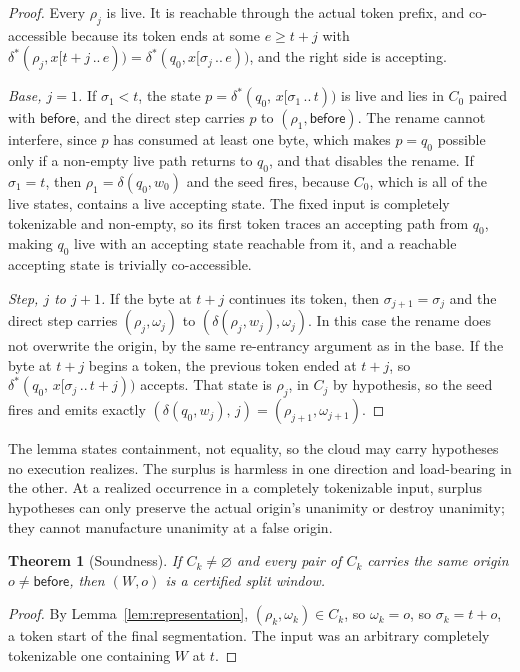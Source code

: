 \documentclass[11pt,a4paper]{article}
\theoremstyle{definition}
\theoremstyle{plain}
\newtheorem{theorem}{Theorem}
\newcommand{\before}{\mathsf{before}}
\begin{document}
\begin{proof}
Every $\rho_j$ is live. It is reachable through the actual token prefix, and co-accessible because its token ends at
some $e \geq t+j$ with $\delta^*(\rho_j, x[t+j \,..\, e)) = \delta^*(q_0, x[\sigma_j \,..\, e))$, and the right side is
accepting.

\emph{Base, $j = 1$.} If $\sigma_1 < t$, the state $p = \delta^*(q_0,\, x[\sigma_1 \,..\, t))$ is live and lies in $C_0$
paired with $\before$, and the direct step carries $p$ to $(\rho_1, \before)$. The rename cannot interfere, since $p$
has consumed at least one byte, which makes $p = q_0$ possible only if a non-empty live path returns to $q_0$, and that
disables the rename. If $\sigma_1 = t$, then $\rho_1 = \delta(q_0, w_0)$ and the seed fires, because $C_0$, which is all
of the live states, contains a live accepting state. The fixed input is completely tokenizable and non-empty, so its
first token traces an accepting path from $q_0$, making $q_0$ live with an accepting state reachable from it, and a
reachable accepting state is trivially co-accessible.

\emph{Step, $j$ to $j+1$.} If the byte at $t+j$ continues its token, then $\sigma_{j+1} = \sigma_j$ and the direct step
carries $(\rho_j, \omega_j)$ to $(\delta(\rho_j, w_j), \omega_j)$. In this case the rename does not overwrite the
origin, by the same re-entrancy argument as in the base. If the byte at $t+j$ begins a token, the previous token ended
at $t+j$, so $\delta^*(q_0,\, x[\sigma_j \,..\, t+j))$ accepts. That state is $\rho_j$, in $C_j$ by hypothesis, so the
seed fires and emits exactly $(\delta(q_0, w_j),\, j) = (\rho_{j+1}, \omega_{j+1})$.
\end{proof}

The lemma states containment, not equality, so the cloud may carry hypotheses no execution realizes. The surplus is
harmless in one direction and load-bearing in the other. At a realized occurrence in a completely tokenizable input,
surplus hypotheses can only preserve the actual origin's unanimity or destroy unanimity; they cannot manufacture
unanimity at a false origin.

\begin{theorem}[Soundness]
\label{thm:soundness}
If $C_k \neq \varnothing$ and every pair of $C_k$ carries the same origin $o \neq \before$, then $(W, o)$ is a certified
split window.
\end{theorem}

\begin{proof}
By Lemma~\ref{lem:representation}, $(\rho_k, \omega_k) \in C_k$, so $\omega_k = o$, so $\sigma_k = t + o$, a token start
of the final segmentation. The input was an arbitrary completely tokenizable one containing $W$ at $t$.
\end{proof}
\end{document}
